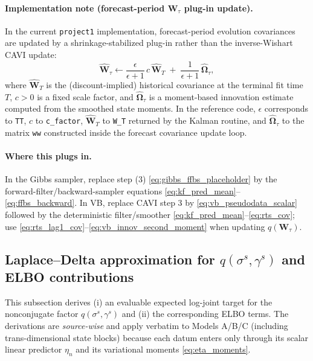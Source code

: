 \documentclass[11pt]{article}
\newcommand{\1}{\mathbb{I}}
\begin{document}
\paragraph{Implementation note (forecast-period $\bm W_\tau$ plug-in update).}
In the current \texttt{project1} implementation, forecast-period evolution covariances are updated by a shrinkage-stabilized
plug-in rather than the inverse-Wishart CAVI update:
\begin{equation}
\widehat{\bm W}_{\tau}
\leftarrow
\frac{\epsilon}{\epsilon+1}\,c\,\widehat{\bm W}_{T}
\;+\;
\frac{1}{\epsilon+1}\,\widehat{\bm\Omega}_{\tau},
\label{eq:forecast_W_plugin}
\end{equation}
where $\widehat{\bm W}_{T}$ is the (discount-implied) historical covariance at the terminal fit time $T$,
$c>0$ is a fixed scale factor, and $\widehat{\bm\Omega}_{\tau}$ is a moment-based innovation estimate computed from the
smoothed state moments. In the reference code, $\epsilon$ corresponds to \texttt{TT}, $c$ to \texttt{c\_factor},
$\widehat{\bm W}_T$ to \texttt{W\_T} returned by the Kalman routine, and $\widehat{\bm\Omega}_\tau$ to the matrix
\texttt{ww} constructed inside the forecast covariance update loop.

\paragraph{Where this plugs in.}
In the Gibbs sampler, replace step (3) \eqref{eq:gibbs_ffbs_placeholder} by the forward-filter/backward-sampler
equations \eqref{eq:kf_pred_mean}--\eqref{eq:ffbs_backward}.
In VB, replace CAVI step 3 by \eqref{eq:vb_pseudodata_scalar} followed by the deterministic filter/smoother
\eqref{eq:kf_pred_mean}--\eqref{eq:rts_cov}; use \eqref{eq:rts_lag1_cov}--\eqref{eq:vb_innov_second_moment}
when updating $q(\bm W_\tau)$.

\subsection{Laplace--Delta approximation for \texorpdfstring{$q(\sigma^s,\gamma^s)$}{q(sigma(s),gamma(s))} and ELBO contributions}
\label{sec:laplace_delta_elbo}

This subsection derives (i) an evaluable expected log-joint target for the nonconjugate factor
$q(\sigma^s,\gamma^s)$ and (ii) the corresponding ELBO terms. The derivations are \emph{source-wise} and apply
verbatim to Models A/B/C (including trans-dimensional state blocks) because each datum enters only through
its scalar linear predictor $\eta_n$ and its variational moments \eqref{eq:eta_moments}.
\end{document}
